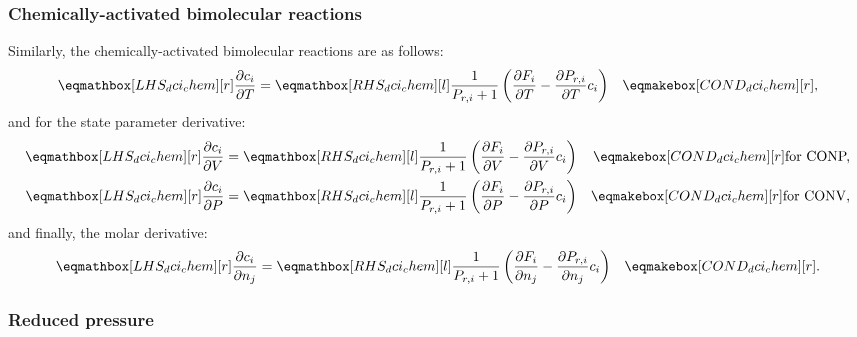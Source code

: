 \documentclass[12pt,number,sort&compress]{elsarticle}
\newcommand{\conp}{CONP}
\newcommand{\conv}{CONV}
\newcommand{\dconp}{\ifmmode\text{for \conp,}\else for \conp,\fi}
\newcommand{\dconv}{\ifmmode\text{for \conv,}\else for \conv,\fi}
\begin{document}
\subsubsection{Chemically-activated bimolecular reactions}
\label{s:dchem}

Similarly, the chemically-activated bimolecular reactions are as follows:
\begin{align}
 \label{e:dci_chem_dt}
 \lhs{dci_chem}{\frac{\partial c_i }{\partial T }} &= \rhs{dci_chem}{\frac{1}{P_{r, i} + 1} \left(\frac{\partial F_{i} }{\partial T } - \frac{\partial P_{r, i} }{\partial T } c_{i}\right)} & \cond{dci_chem}{,} \\
 \end{align}
and for the state parameter derivative:
\begin{subequations}
 \label{e:dci_chem_de}
 \begin{align}
  \lhs{dci_chem}{\frac{\partial c_i }{\partial V }} &= \rhs{dci_chem}{\frac{1}{P_{r, i} + 1} \left(\frac{\partial F_{i} }{\partial V } - \frac{\partial P_{r, i} }{\partial V } c_{i}\right)} & \cond{dci_chem}{\dconp} \\
  \lhs{dci_chem}{\frac{\partial c_i }{\partial P }} &= \rhs{dci_chem}{\frac{1}{P_{r, i} + 1} \left(\frac{\partial F_{i} }{\partial P } - \frac{\partial P_{r, i} }{\partial P } c_{i}\right)} & \cond{dci_chem}{\dconv}
 \end{align}
\end{subequations}
and finally, the molar derivative:
\begin{align}
 \label{e:dci_chem_dnj}
 \lhs{dci_chem}{\frac{\partial c_i }{\partial n_j }} &= \rhs{dci_chem}{\frac{1}{P_{r, i} + 1} \left(\frac{\partial F_{i} }{\partial n_j } - \frac{\partial P_{r, i} }{\partial n_j } c_{i}\right)} & \cond{dci_chem}{.}
\end{align}


\subsubsection{Reduced pressure}
\label{s:dpr}
\end{document}
